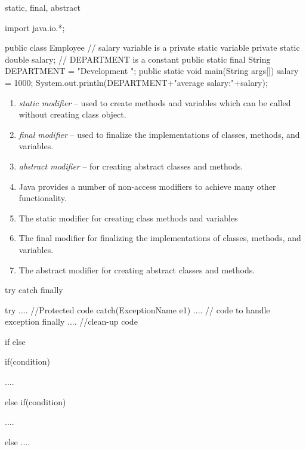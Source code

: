 \documentclass[11pt]{beamer}
\begin{document}
\begin{frame}{static, final, abstract}

\begin{java}

import java.io.*;

public class Employee{
// salary variable is a private static variable
private static double salary;
// DEPARTMENT is a constant
public static final String DEPARTMENT = "Development ";
public static void main(String args[]){
salary = 1000;
System.out.println(DEPARTMENT+"average salary:"+salary);
}
}
\end{java}

\begin{enumerate}
\item \emph{static modifier} -- used to create methods and variables which can be called without creating class object.
\item \emph{final modifier} -- used to finalize the implementations of classes, methods, and variables.
\item \emph{abstract modifier} -- for creating abstract classes and methods.
\item Java provides a number of non-access modifiers to achieve many other functionality.
\item The static modifier for creating class methods and variables 
\item The final modifier for finalizing the implementations of classes, methods, and variables.
\item The abstract modifier for creating abstract classes and methods.
\end{enumerate}

\end{frame}

\begin{frame}[containsverbatim]{try catch finally}
\begin{java}
try{
	....
	//Protected code
}catch(ExceptionName e1){
	....
	// code to handle exception
}finally{
	....
	//clean-up code
}
	
\end{java}
\end{frame}

\begin{frame}{if else}
\begin{java}
if(condition){
	....
	
}else if(condition){
	....
	
}else{
	....
}
\end{java}
\end{frame}
\end{document}
